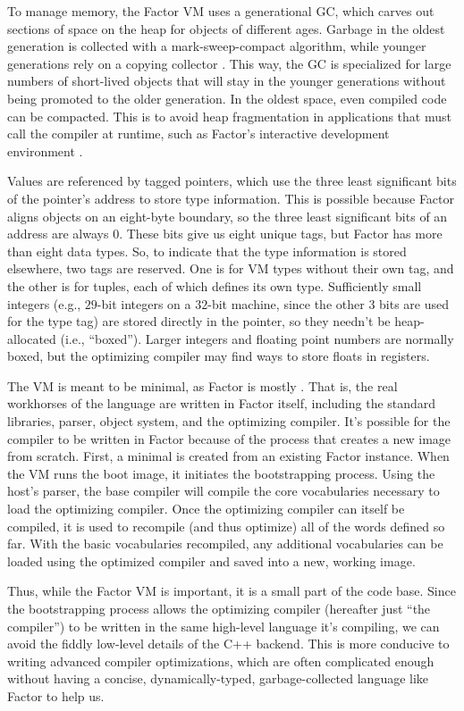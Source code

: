 To manage memory, the Factor \gls{VM} uses a generational \gls{GC}, which
carves out sections of space on the heap for objects of different ages.
Garbage in the oldest generation is collected with a mark-sweep-compact
algorithm, while younger generations rely on a copying collector
\autocite{GGC}.  This way, the \gls{GC} is specialized for large numbers of
short-lived objects that will stay in the younger generations without being
promoted to the older generation.  In the oldest space, even compiled code can
be compacted.  This is to avoid heap fragmentation in applications that must
call the compiler at runtime, such as Factor's interactive development
environment \autocite{DLS}.

Values are referenced by tagged pointers, which use the three least significant
bits of the pointer's address to store type information.  This is possible
because Factor aligns objects on an eight-byte boundary, so the three least
significant bits of an address are always $0$.  These bits give us eight unique
tags, but Factor has more than eight data types.  So, to indicate that the type
information is stored elsewhere, two tags are reserved.  One is for \gls{VM}
types without their own tag, and the other is for tuples, each of which defines
its own type.  Sufficiently small integers (e.g., $29$-bit integers on a
$32$-bit machine, since the other $3$ bits are used for the type tag) are
stored directly in the pointer, so they needn't be heap-allocated (i.e.,
``boxed'').  Larger integers and floating point numbers are normally boxed, but
the optimizing compiler may find ways to store floats in registers.

The \gls{VM} is meant to be minimal, as Factor is mostly .
That is, the real workhorses of the language are written in Factor itself,
including the standard libraries, parser, object system, and the optimizing
compiler.  It's possible for the compiler to be written in Factor because of
the  process that creates a new image from scratch.  First,
a minimal  is created from an existing  Factor
instance.  When the \gls{VM} runs the boot image, it initiates the
bootstrapping process.  Using the host's parser, the base compiler will compile
the core vocabularies necessary to load the optimizing compiler.  Once the
optimizing compiler can itself be compiled, it is used to recompile (and thus
optimize) all of the words defined so far.  With the basic vocabularies
recompiled, any additional vocabularies can be loaded using the optimized
compiler and saved into a new, working image.

Thus, while the Factor \gls{VM} is important, it is a small part of the code
base.  Since the bootstrapping process allows the optimizing compiler
(hereafter just ``the compiler'') to be written in the same high-level language
it's compiling, we can avoid the fiddly low-level details of the C++ backend.
This is more conducive to writing advanced compiler optimizations, which are
often complicated enough without having a concise, dynamically-typed,
garbage-collected language like Factor to help us.
